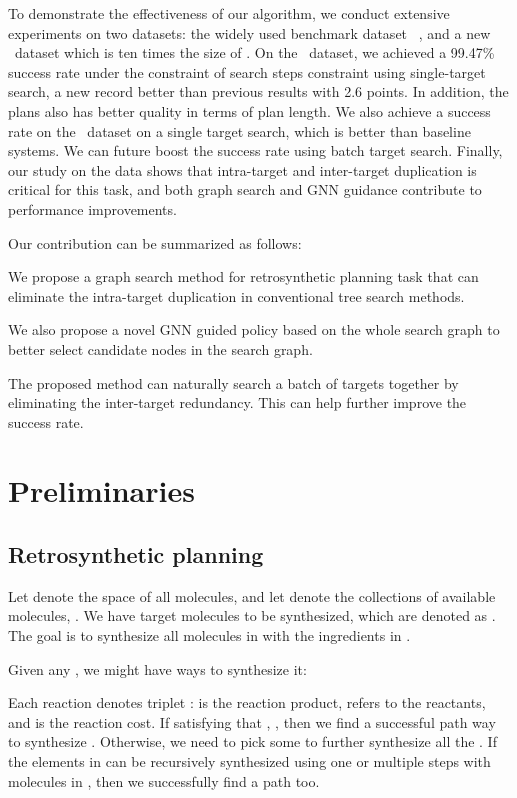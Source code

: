\documentclass[sigconf]{acmart}
\begin{document}
To demonstrate the effectiveness of our algorithm, we conduct extensive experiments on two datasets: the widely used benchmark dataset \uspto ~\cite{Chen2020}, and a new \usptoext~dataset which is ten times the size of \uspto.
On the \uspto~dataset, we achieved a 99.47\% success rate under the constraint of  search steps constraint using single-target search, a new record better than previous results with 2.6 points.
In addition, the plans also has better quality in terms of plan length.
We also achieve a  success rate on the \usptoext~dataset on a single target search, which is better than baseline systems.
We can future boost the success rate using batch target search.
Finally, our study on the data shows that intra-target and inter-target duplication is critical for this task, and both graph search and GNN guidance contribute to performance improvements.



Our contribution can be summarized as follows:

 We propose a graph search method for retrosynthetic planning task that can eliminate the intra-target duplication in conventional tree search methods.

 We also propose a novel GNN guided policy based on the whole search graph to better select candidate nodes in the search graph.

 The proposed method can naturally search a batch of targets together by eliminating the inter-target redundancy. This can help further improve the success rate.





\section{Preliminaries}

\subsection{Retrosynthetic planning}

Let  denote the space of all molecules, and let  denote the collections of available molecules, . We have  target molecules to be synthesized, which are denoted as . The goal is to synthesize all molecules in  with  the ingredients in . 


Given any , we might have   ways to synthesize it:

Each reaction  denotes triplet :  is the reaction product,  refers to the reactants, and  is the reaction cost. If  satisfying that  , , then we find a successful path way to synthesize . Otherwise, we need to pick some  to further synthesize all the . If the elements in  can be recursively synthesized using one or multiple steps with molecules in , then we successfully find a path too.
\end{document}

